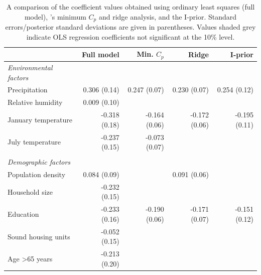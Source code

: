 \documentclass[11pt,twoside,openright]{report}
\begin{document}
\begin{table}[htb]
\centering
\caption[Results for the mortality and air pollution BVS model.]{A comparison of the coefficient values obtained using ordinary least squares (full model), \citeauthor{McDonald1973}'s minimum $C_p$ and ridge analysis, and the I-prior. Standard errors/posterior standard deviations are given in parentheses. Values shaded grey indicate OLS regression coefficients not significant at the 10\% level.}
\label{tab:poll}
\begin{tabular}{lrrrr}
\toprule
& Full model & Min. $C_p$ & Ridge  & I-prior \\ \midrule
\emph{Environmental factors} \\
\hspace{0.5em} Precipitation            & 0.306 (0.14)                 & 0.247 (0.07)   & 0.230 (0.07)      & 0.254 (0.12)       \\
\hspace{0.5em} Relative humidity        & {\color{grymath} 0.009 (0.10)}  &                &                   &         \\
\hspace{0.5em} January temperature      & {\color{grymath} -0.318 (0.18)} & -0.164 (0.06)  & -0.172 (0.06)     & -0.195 (0.11)        \\
\hspace{0.5em} July temperature         & {\color{grymath} -0.237 (0.15)} & -0.073 (0.07)  &                   &         \\
\\
\emph{Demographic factors} \\
\hspace{0.5em} Population density       & {\color{grymath} 0.084 (0.09)}  &                & 0.091 (0.06)      &         \\
\hspace{0.5em} Household size & {\color{grymath} -0.232 (0.15)} &                &                   &         \\
\hspace{0.5em} Education                & {\color{grymath} -0.233 (0.16)} & -0.190 (0.06)  & -0.171 (0.07)     & -0.151 (0.12)        \\
\hspace{0.5em} Sound housing units   & {\color{grymath} -0.052 (0.15)} &                &                   &         \\
\hspace{0.5em} Age >65 years     & {\color{grymath} -0.213 (0.20)} &                &                   &         \\

\end{tabular}
\end{table}
\end{document}
